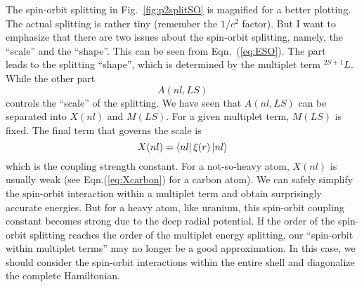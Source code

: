 The spin-orbit splitting in Fig.~\ref{fig:p2splitSO} is magnified for a better plotting.
The actual splitting is rather tiny (remember the $1/c^2$ factor). But I want to
emphasize that there are two issues about the spin-orbit splitting, namely,
the ``scale'' and the ``shape''. This can be seen from Eqn.~(\ref{eq:ESO}).
The part
\begin{equation*}
[J(J+1)-L(L+1)-S(S+1)]
\end{equation*}
leads to the splitting ``shape'', which is determined by the multiplet term $^{2S+1}L$.
While the other part
\begin{equation*}
A(nl,LS)
\end{equation*}
controls the ``scale'' of the splitting.
We have seen that $A(nl,LS)$ can be separated into $X(nl)$ and $M(LS)$. For a
given multiplet term, $M(LS)$ is fixed. The final term that governs the scale is
\begin{equation*}
X(nl) = \Bra{nl}\xi(r)\Ket{nl} 
\end{equation*}
which is the coupling strength constant. For a not-so-heavy atom, $X(nl)$ is usually
weak (see Eqn.(\ref{eq:Xcarbon}) for a carbon atom). We can safely simplify
the spin-orbit interaction within a multiplet term and obtain surprisingly
accurate energies. But for a heavy atom, like uranium,
this spin-orbit coupling constant becomes strong due to the deep radial potential.
If the order of the spin-orbit splitting reaches the order of the multiplet
energy splitting, our ``spin-orbit within multiplet terms'' may no longer be
a good approximation. In this case, we should consider the spin-orbit interactions
within the entire shell and diagonalize the complete Hamiltonian.

